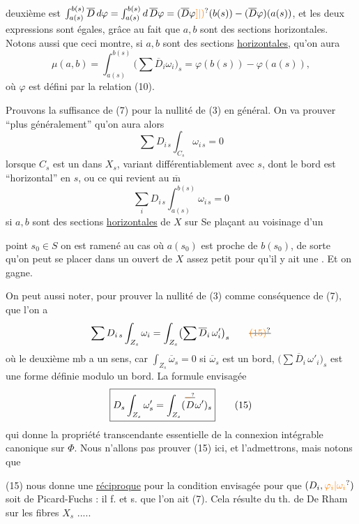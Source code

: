 deuxième est $\int_{a(s)}^{b(s)}\overline D\,d\varphi
=\int_{a(s)}^{b(s)}d\,\overline D\varphi
=(\overline D\varphi\unsure{]|)}(b(s))-(\overline D\varphi)(a(s))$,
 et les deux expressions sont égales, grâce au fait que $a,b$ sont des sections horizontales. Notons aussi que ceci montre, si $a,b$ sont des sections \uline{horizontales}, qu'on aura
\[
 \mu(a,b)=\int_{a(s)}^{b(s)}\bigl(\sum\overline D_i\omega_i\bigr)_s
 =\varphi(b(s))-\varphi(a(s)),\tag*{(14)}
\]
où $\varphi$ est défini par la relation (10).

Prouvons la suffisance de (7) pour la nullité de (3) en général. On va prouver ``plus généralement'' qu'on aura alors
\[
 \sum D_{i\,s}\int_{C_s}\omega_{i\,s}=0
\]
lorsque $C_s$ est un  dans $X_s$, variant différentiablement avec $s$, dont le bord est ``horizontal'' en $s$, ou ce qui revient au $\overline{\mathrm m}$
\[
 \sum_i D_{i\,s}\int_{a(s)}^{b(s)}\omega_{i\,s}=0
\]
si $a,b$ sont des sections \uline{horizontales} de $X$ sur    Se plaçant au voisinage d'un

point $s_0\in S$ on est ramené  au cas où $a(s_0)$ est proche de $b(s_0)$, de sorte qu'on peut  se placer dans un ouvert de $X$ assez petit pour qu'il y ait une . Et on gagne.

On peut aussi noter,  pour prouver la  nullité de (3) comme conséquence de (7), que l'on a
\[
 \sum D_{i\,s}\int_{Z_s}\omega_i
 =\int_{Z_s}\bigl(\sum\overline D_i\,\omega'_i\bigr)_s
 \tag*{\deleted{\unsure{(15)}}}
\]
où le deuxième mb a un sens, car $\int_{Z_s}\overline\omega_s=0$ si $\overline\omega_s$ est un bord,  $\bigl(\sum\overline D_i\,\omega'_i\bigr)_s$ est une forme définie modulo un bord. La formule envisagée  
\[
 \boxed{D_s\int_{Z_s}\omega'_s=\int_{Z_s}(\overset{\deleted{\unsure{-}}}{D}\omega')_s}
 \tag*{(15)}
\]
qui donne la propriété transcendante essentielle de la connexion intégrable canonique sur $\Phi$. Nous n'allons pas prouver (15) ici, et l'admettrons, mais notons que

(15) nous donne une \uline{réciproque} pour la condition envisagée pour que $(D_i,\unsure{\varphi_i|\omega_i})$ soit de Picard-Fuchs : il f. et s. que l'on ait (7). Cela résulte du th. de De Rham sur les fibres $X_s$ .....

